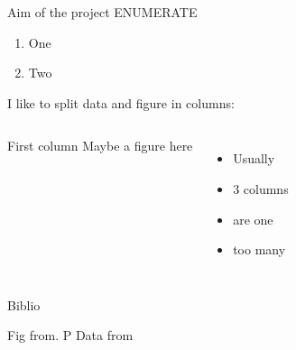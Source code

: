 \documentclass[10pt,aspectration=169]{beamer}
\begin{document}
\begin{frame}{Aim of the project}
ENUMERATE
\begin{enumerate}
    \item One
    \item Two 
\end{enumerate}
\begin{small}
\begin{center}

I like to split data and figure in columns: \\
\begin{columns}

First column
Maybe a figure here
\begin{itemize}
    \item[] Usually
    \item[] 3 columns
    \item[] are one
    \item[] too many
\end{itemize}
\end{columns}
\end{center}
\end{small}

\end{frame}
%

\begin{frame}{Biblio}
    
\begin{small}
Fig from. P Data from
\end{small}
\addtocounter{footnote}{-1}
\end{frame}
\end{document}
